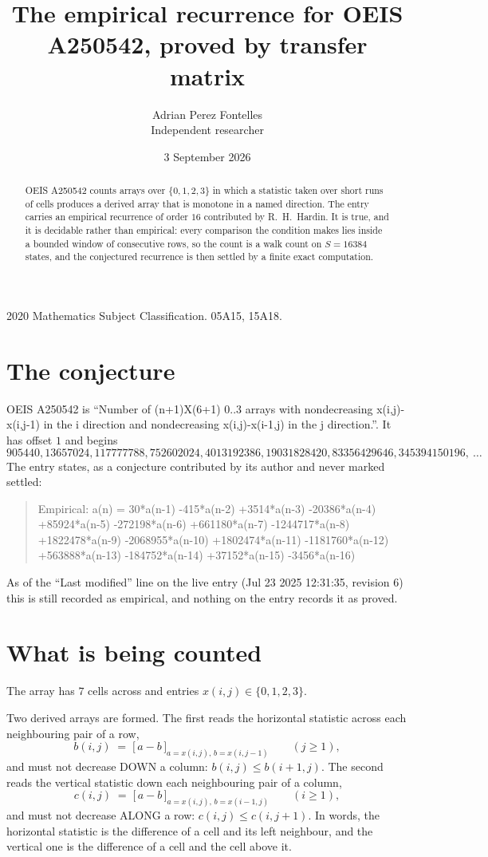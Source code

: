 \documentclass[11pt,a4paper]{article}
\title{The empirical recurrence for OEIS A250542, proved by transfer matrix}
\author{Adrian Perez Fontelles\\ \small Independent researcher}
\date{3 September 2026}
\theoremstyle{plain}
\theoremstyle{definition}
\begin{document}
\maketitle

\begin{abstract}
OEIS A250542 counts arrays over $\{0,1,2,3\}$ in which a statistic taken over short runs
of cells produces a derived array that is monotone in a named direction. The entry carries an
empirical recurrence of order $16$ contributed by R.~H.~Hardin. It is true, and it is
decidable rather than empirical: every comparison the condition makes lies inside a bounded
window of consecutive rows, so the count is a walk count on $S=16384$ states, and the
conjectured recurrence is then settled by a finite exact computation.
\end{abstract}

\noindent\small 2020 Mathematics Subject Classification. 05A15, 15A18.\normalsize

\section{The conjecture}

OEIS A250542 is ``Number of (n+1)X(6+1) 0..3 arrays with nondecreasing x(i,j)-x(i,j-1) in the i direction and nondecreasing x(i,j)-x(i-1,j) in the j direction.''. It has offset $1$ and begins
\[
905440, 13657024, 117777788, 752602024, 4013192386, 19031828420, 83356429646, 345394150196,\ \dots
\]
The entry states, as a conjecture contributed by its author and never marked settled:
\begin{quote}
Empirical: a(n) = 30*a(n-1) -415*a(n-2) +3514*a(n-3) -20386*a(n-4) +85924*a(n-5) -272198*a(n-6) +661180*a(n-7) -1244717*a(n-8) +1822478*a(n-9) -2068955*a(n-10) +1802474*a(n-11) -1181760*a(n-12) +563888*a(n-13) -184752*a(n-14) +37152*a(n-15) -3456*a(n-16)
\end{quote}
As of the ``Last modified'' line on the live entry (Jul 23 2025 12:31:35, revision 6) this is still
recorded as empirical, and nothing on the entry records it as proved.

\section{What is being counted}

The array has $7$ cells across and entries $x(i,j)\in\{0,1,2,3\}$.

Two derived arrays are formed. The first reads the horizontal statistic across each
neighbouring pair of a row,
\[
b(i,j)\;=\;\bigl[\,a-b\,\bigr]_{a=x(i,j),\,b=x(i,j-1)}\qquad (j\ge1),
\]
and must not decrease DOWN a column: $b(i,j)\le b(i{+}1,j)$. The second reads the vertical
statistic down each neighbouring pair of a column,
\[
c(i,j)\;=\;\bigl[\,a-b\,\bigr]_{a=x(i,j),\,b=x(i{-}1,j)}\qquad (i\ge1),
\]
and must not decrease ALONG a row: $c(i,j)\le c(i,j{+}1)$. In words, the horizontal statistic
is the difference of a cell and its left neighbour, and the vertical one is
the difference of a cell and the cell above it.
\end{document}
